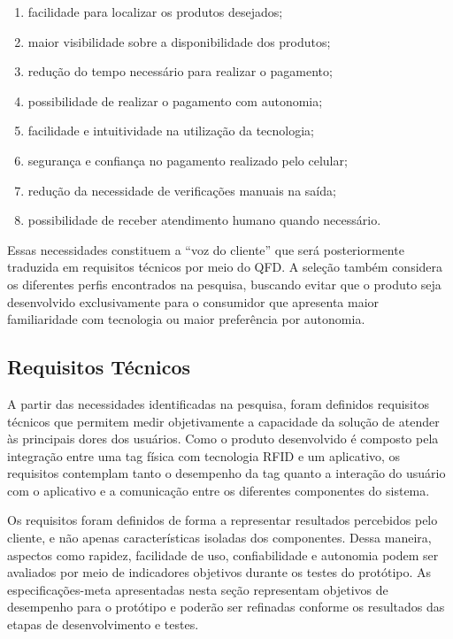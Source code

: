 \begin{enumerate}
\item facilidade para localizar os produtos desejados;
\item maior visibilidade sobre a disponibilidade dos produtos;
\item redução do tempo necessário para realizar o pagamento;
\item possibilidade de realizar o pagamento com autonomia;
\item facilidade e intuitividade na utilização da tecnologia;
\item segurança e confiança no pagamento realizado pelo celular;
\item redução da necessidade de verificações manuais na saída;
\item possibilidade de receber atendimento humano quando necessário.
\end{enumerate}

Essas necessidades constituem a ``voz do cliente'' que será posteriormente traduzida em requisitos técnicos por meio do QFD. A seleção também considera os diferentes perfis encontrados na pesquisa, buscando evitar que o produto seja desenvolvido exclusivamente para o consumidor que apresenta maior familiaridade com tecnologia ou maior preferência por autonomia.

\subsection{Requisitos Técnicos}
\label{subsec:requisitos_tecnicos}

A partir das necessidades identificadas na pesquisa, foram definidos requisitos técnicos que permitem medir objetivamente a capacidade da solução de atender às principais dores dos usuários. Como o produto desenvolvido é composto pela integração entre uma tag física com tecnologia RFID e um aplicativo, os requisitos contemplam tanto o desempenho da tag quanto a interação do usuário com o aplicativo e a comunicação entre os diferentes componentes do sistema.

Os requisitos foram definidos de forma a representar resultados percebidos pelo cliente, e não apenas características isoladas dos componentes. Dessa maneira, aspectos como rapidez, facilidade de uso, confiabilidade e autonomia podem ser avaliados por meio de indicadores objetivos durante os testes do protótipo. As especificações-meta apresentadas nesta seção representam objetivos de desempenho para o protótipo e poderão ser refinadas conforme os resultados das etapas de desenvolvimento e testes.


